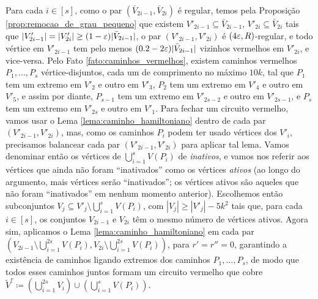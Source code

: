 Para cada $i\in [s]$, como o par $(\bar{V}_{2i-1}, \bar{V}_{2i})$ é regular, temos pela Proposição \ref{prop:remocao_de_grau_pequeno} que existem $V'_{2i-1}\subseteq\bar{V}_{2i-1}$, $V'_{2i}\subseteq\bar{V}_{2i}$ tais que $|V'_{2i-1}| = |V'_{2i}|\geq (1-\varepsilon)|\bar{V}_{2i-1}|$, o par $(V'_{2i-1}, V'_{2i})$ é $(4\varepsilon, R)$-regular, e todo vértice em $V'_{2i-1}$ tem pelo menos $(0.2-2\varepsilon)|\bar{V}_{2i-1}|$ vizinhos vermelhos em $V'_{2i}$, e vice-versa. Pelo Fato \ref{fato:caminhos_vermelhos}, existem caminhos vermelhos $P_1, \dots, P_s$ vértice-disjuntos, cada um de comprimento no máximo $10k$, tal que $P_1$ tem um extremo em $V'_2$ e outro em $V'_3$, $P_2$ tem um extremo em $V'_4$ e outro em $V'_5$, e assim por diante, $P_{s-1}$ tem um extremo em $V'_{2s-2}$ e outro em $V'_{2s-1}$, e $P_s$ tem um extremo em $V'_{2s}$ e outro em $V'_1$. Para fechar um circuito vermelho, vamos usar o Lema \ref{lema:caminho_hamiltoniano} dentro de cada par $(V'_{2i-1}, V'_{2i})$, mas, como os caminhos $P_i$ podem ter usado vértices dos $V'_i$, precisamos balancear cada par $(V'_{2i-1}, V'_{2i})$ para aplicar tal lema. Vamos denominar então os vértices de $\bigcup_{i=1}^{s}V(P_i)$ de \emph{inativos}, e vamos nos referir aos vértices que ainda não foram ``inativados'' como os vértices \emph{ativos} (ao longo do argumento, mais vértices serão ``inativados''; os vértices ativos são aqueles que não foram ``inativados'' em nenhum momento anterior). Escolhemos então subconjuntos $V_j\subseteq V'_j\setminus\bigcup_{i=1}^{s}V(P_i)$, com $|V_j|\geq |V'_j| - 5k^2$ tais que, para cada $i\in [s]$, os conjuntos $V_{2i-1}$ e $V_{2i}$ têm o mesmo número de vértices ativos. Agora sim, aplicamos o Lema \ref{lema:caminho_hamiltoniano} em cada par $(V_{2i-1}\setminus\bigcup_{i=1}^{2s} V(P_i), V_{2i}\setminus\bigcup_{i=1}^{2s} V(P_i))$, para $r'=r''=0$, garantindo a existência de caminhos ligando extremos dos caminhos $P_1, \dots, P_s$, de modo que todos esses caminhos juntos formam um circuito vermelho que cobre $\tilde{V}^r\coloneqq(\bigcup_{i=1}^{2s}V_i)\cup (\bigcup_{i=1}^{s}V(P_i))$.

